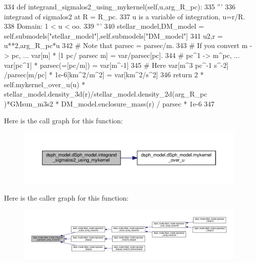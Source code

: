 \begin{DoxyCode}
334     \textcolor{keyword}{def }integrand\_sigmalos2\_using\_mykernel(self,u,arg\_R\_pc):
335         \textcolor{stringliteral}{'''}
336 \textcolor{stringliteral}{        integrand of sigmalos2 at R = R\_pc.}
337 \textcolor{stringliteral}{        u is a variable of integration, u=r/R.}
338 \textcolor{stringliteral}{        Domain: 1 < u < oo.}
339 \textcolor{stringliteral}{        '''}
340         stellar\_model,DM\_model = self.submodels[\textcolor{stringliteral}{"stellar\_model"}],self.submodels[\textcolor{stringliteral}{"DM\_model"}]
341         u2,r = u**2,arg\_R\_pc*u
342         \textcolor{comment}{# Note that parsec = parsec/m.}
343         \textcolor{comment}{# If you convert m -> pc,      ... var[m] * [1 pc/ parsec m] = var/parsec[pc].}
344         \textcolor{comment}{#                pc^1 -> m^pc, ... var[pc^1] * parsec(=[pc/m]) = var[m^-1]}
345         \textcolor{comment}{# Here var[m^3 pc^-1 s^-2] /parsec[m/pc] * 1e-6[km^2/m^2] = var[km^2/s^2]}
346         \textcolor{keywordflow}{return} 2 * self.mykernel\_over\_u(u) *  stellar\_model.density\_3d(r)/stellar\_model.density\_2d(arg\_R\_pc
      )*GMsun\_m3s2 * DM\_model.enclosure\_mass(r) / parsec * 1e-6
347 
\end{DoxyCode}
Here is the call graph for this function\+:\nopagebreak
\begin{figure}[H]
\begin{center}
\leavevmode
\includegraphics[width=350pt]{d0/d25/classdsph__model_1_1dSph__model_a5df6fa479eb9092d850da8779073eed5_cgraph}
\end{center}
\end{figure}
Here is the caller graph for this function\+:\nopagebreak
\begin{figure}[H]
\begin{center}
\leavevmode
\includegraphics[width=350pt]{d0/d25/classdsph__model_1_1dSph__model_a5df6fa479eb9092d850da8779073eed5_icgraph}
\end{center}
\end{figure}
\mbox{\label{classdsph__model_1_1dSph__model_a5e0091742da19919dc6c085a806ad6e0}} 
